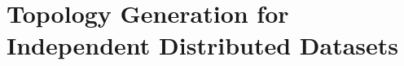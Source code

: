 \chapter{Topology Generation for Independent Distributed Datasets\label{chap:topologies}}
\localtoc

\providecommand{\thecontrib}{}
\renewcommand{\thecontrib}{\texttt{FedITN\_gen}\xspace}






%

